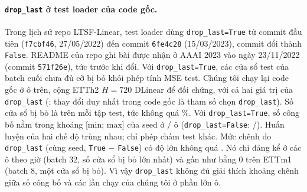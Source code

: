 \begin{captionbelowboxaivn}
\label{tab:b1}
\end{captionbelowboxaivn}
\begin{center}
\footnotesize

\end{center}

\paragraph{\texttt{drop\_last} ở test loader của code gốc.} Trong lịch sử repo LTSF-Linear, test loader dùng \texttt{drop\_last=True} từ commit đầu tiên (\texttt{f7cbf46}, 27/05/2022) đến commit \texttt{6fe4c28} (15/03/2023), commit đổi thành \texttt{False}. README của repo ghi bài được nhận ở AAAI 2023 vào ngày 23/11/2022 (commit \texttt{571f26e}), tức trước khi đổi. Với \texttt{drop\_last=True}, các cửa sổ test của batch cuối chưa đủ cỡ bị bỏ khỏi phép tính MSE test. Chúng tôi chạy lại code gốc ở \nmDropCellCount{} ô trên, cộng ETTh2 $H = 720$ DLinear để đối chứng, với cả hai giá trị của \texttt{drop\_last} (; thay đổi duy nhất trong code gốc là tham số chọn \texttt{drop\_last}). Số cửa sổ bị bỏ là \nmDropDroppedRange{} trên mỗi tập test, tức không quá \nmDropDroppedPctMax\%. Với \texttt{drop\_last=True}, số công bố nằm trong khoảng [min; max] của \nmDropSeedCount{} seed ở \nmDropPubInTrueCount/\nmDropCellCount{} ô (\texttt{drop\_last=False}: \nmDropPubInFalseCount/\nmDropCellCount). Huấn luyện của hai chế độ trùng nhau; chỉ phép chấm test khác. Mức chênh do \texttt{drop\_last} (cùng seed, \texttt{True} $-$ \texttt{False}) có độ lớn không quá \nmDropDiffAbsMax. Nó chỉ đáng kể ở các ô theo giờ (batch 32, số cửa sổ bị bỏ lớn nhất) và gần như bằng $0$ trên ETTm1 (batch 8, một cửa sổ bị bỏ). Vì vậy \texttt{drop\_last} không đủ giải thích khoảng chênh giữa số công bố và các lần chạy của chúng tôi ở phần lớn ô.

\begin{captionbelowboxaivn}
\label{tab:droplast}
\end{captionbelowboxaivn}
\begin{center}
\small

\end{center}

